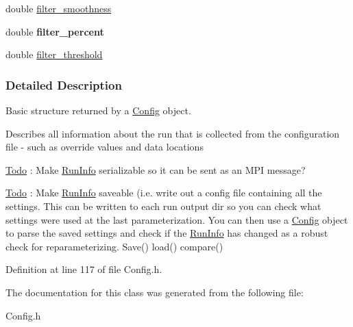 \begin{DoxyCompactItemize}
\item 
\hypertarget{classRunInfo_a22c87862666b62fe0ef8730b2ccecdc2}{
double \hyperlink{classRunInfo_a22c87862666b62fe0ef8730b2ccecdc2}{filter\_\-smoothness}}
\label{classRunInfo_a22c87862666b62fe0ef8730b2ccecdc2}

\item 
\hypertarget{classRunInfo_abf51037c6f453aa857c6050f1b957a9b}{
double {\bfseries filter\_\-percent}}
\label{classRunInfo_abf51037c6f453aa857c6050f1b957a9b}

\item 
\hypertarget{classRunInfo_a28a6b7962b55bfdf725979206e9c86fe}{
double \hyperlink{classRunInfo_a28a6b7962b55bfdf725979206e9c86fe}{filter\_\-threshold}}
\label{classRunInfo_a28a6b7962b55bfdf725979206e9c86fe}

\end{DoxyCompactItemize}


\subsubsection{Detailed Description}
Basic structure returned by a \hyperlink{classConfig}{Config} object. 

Describes all information about the run that is collected from the configuration file -\/ such as override values and data locations

\begin{Desc}
\item[\hyperlink{todo__todo000002}{Todo}]: Make \hyperlink{classRunInfo}{RunInfo} serializable so it can be sent as an MPI message?\end{Desc}


\begin{Desc}
\item[\hyperlink{todo__todo000003}{Todo}]: Make \hyperlink{classRunInfo}{RunInfo} saveable (i.e. write out a config file containing all the settings. This can be written to each run output dir so you can check what settings were used at the last parameterization. You can then use a \hyperlink{classConfig}{Config} object to parse the saved settings and check if the \hyperlink{classRunInfo}{RunInfo} has changed as a robust check for reparameterizing. Save() load() compare()\end{Desc}


Definition at line 117 of file Config.h.



The documentation for this class was generated from the following file:\begin{DoxyCompactItemize}
\item 
Config.h\end{DoxyCompactItemize}
